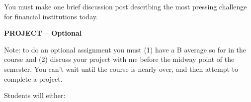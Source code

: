 \documentclass{article}
\begin{document}
You must make one brief discussion post describing the most pressing challenge for financial institutions today.

\begin{center}
{\bf PROJECT -- Optional}
\end{center}
Note:  to do an optional assignment you must (1) have a B average so for in the course and (2) discuss your project with me before the midway point of the semester.  You can't wait until the course is nearly over, and then attempt to complete a project.

Students will either:
\end{document}
